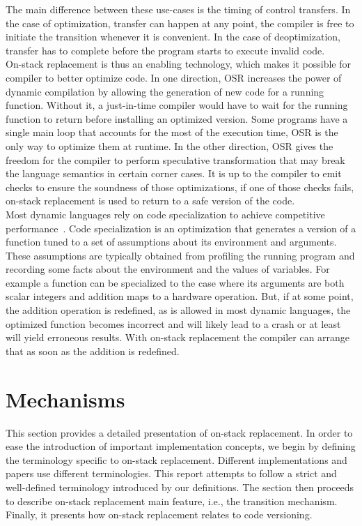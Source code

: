 The main difference between these use-cases is the timing of control transfers.
In the case of optimization, transfer can happen at any point, the compiler is free to initiate the transition whenever it is convenient.
In the case of deoptimization, transfer has to complete before the program starts to execute invalid code.\\

On-stack replacement is thus an enabling technology, which makes it possible
for compiler to better optimize code.  In one direction, OSR increases the
power of dynamic compilation by allowing the generation of new code for a
running function. Without it, a just-in-time compiler would have to wait for
the running function to return before installing an optimized version.  Some
programs have a single main loop that accounts for the most of the execution
time, OSR is the only way to optimize them at runtime. In the other
direction, OSR gives the freedom for the compiler to perform speculative
transformation that may break the language semantics in certain corner
cases. It is up to the compiler to emit checks to ensure the soundness of
those optimizations, if one of those checks fails, on-stack replacement is
used to return to a safe version of the code.\\

Most dynamic languages rely on code specialization to achieve competitive
performance~\cite{gal2009trace}. Code specialization is an optimization that
generates a version of a function tuned to a set of assumptions about its
environment and arguments. These assumptions are typically obtained from
profiling the running program and recording some facts about the environment
and the values of variables. For example a function can be specialized to
the case where its arguments are both scalar integers and addition maps to
a hardware operation. But, if at some point, the addition operation is
redefined, as is allowed in most dynamic languages, the optimized function
becomes incorrect and will likely lead to a crash or at least will yield
erroneous results.  With on-stack replacement the compiler can arrange that
as soon as the addition is redefined.

\section{Mechanisms}

This section provides a detailed presentation of on-stack replacement.
In order to ease the introduction of important implementation concepts, we begin by defining the terminology specific to on-stack replacement.
Different implementations and papers use different terminologies.
This report attempts to follow a strict and well-defined terminology introduced by our definitions. 
The section then proceeds to describe on-stack replacement main feature, i.e., the transition mechanism.
Finally, it presents how on-stack replacement relates to code versioning.

